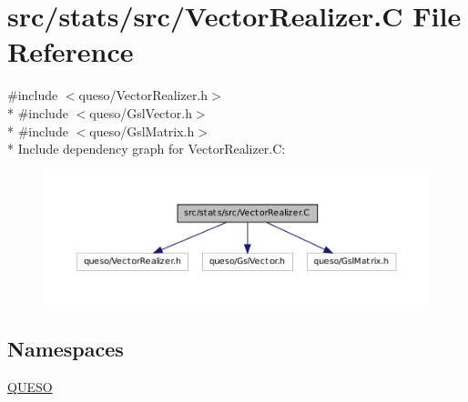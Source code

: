\hypertarget{_vector_realizer_8_c}{\section{src/stats/src/\-Vector\-Realizer.C File Reference}
\label{_vector_realizer_8_c}
}
{\ttfamily \#include $<$queso/\-Vector\-Realizer.\-h$>$}\\*
{\ttfamily \#include $<$queso/\-Gsl\-Vector.\-h$>$}\\*
{\ttfamily \#include $<$queso/\-Gsl\-Matrix.\-h$>$}\\*
Include dependency graph for Vector\-Realizer.\-C\-:
\nopagebreak
\begin{figure}[H]
\begin{center}
\leavevmode
\includegraphics[width=350pt]{_vector_realizer_8_c__incl}
\end{center}
\end{figure}
\subsection*{Namespaces}
\begin{DoxyCompactItemize}
\item 
\hyperlink{namespace_q_u_e_s_o}{Q\-U\-E\-S\-O}
\end{DoxyCompactItemize}

